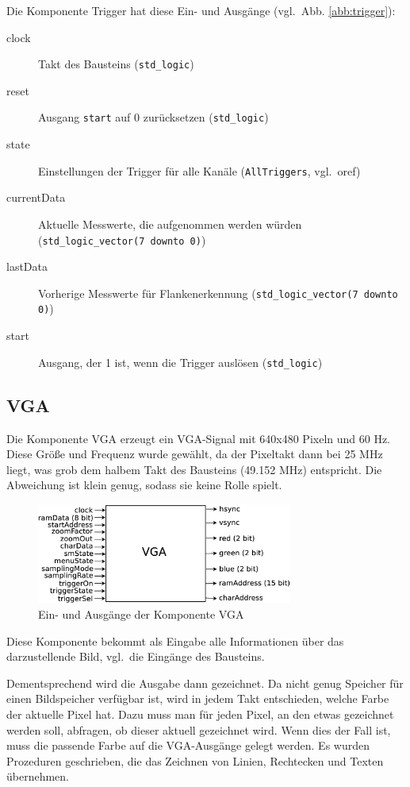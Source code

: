 \documentclass[IN,ngerman,utf8,12pt]{tumbook}
\newcommand{\vgl}{vgl.\ }
\begin{document}
Die Komponente Trigger hat diese Ein- und Ausgänge (\vgl Abb. \ref{abb:trigger}):

\begin{description}
    \item[clock] Takt des Bausteins (\texttt{std\_logic})
    \item[reset] Ausgang \texttt{start} auf 0 zurücksetzen (\texttt{std\_logic})
    \item[state] Einstellungen der Trigger für alle Kanäle (\texttt{AllTriggers}, \vgl o{ref})
    \item[currentData] Aktuelle Messwerte, die aufgenommen werden würden (\texttt{std\_logic\_vector(7 downto 0)})
    \item[lastData] Vorherige Messwerte für Flankenerkennung (\texttt{std\_logic\_vector(7 downto 0)})
    \item[start] Ausgang, der 1 ist, wenn die Trigger auslösen (\texttt{std\_logic})
\end{description}

\subsection{VGA}

Die Komponente VGA erzeugt ein VGA-Signal mit 640x480 Pixeln und 60 Hz.
Diese Größe und Frequenz wurde gewählt, da der Pixeltakt dann bei 25 MHz liegt, was grob dem halbem Takt des Bausteins (49.152 MHz) entspricht.
Die Abweichung ist klein genug, sodass sie keine Rolle spielt.

\begin{figure}[H]
    \centerline{
        \includegraphics[width=0.75\textwidth]{img/vga}
    }
    \label{abb:vga}
    \caption{Ein- und Ausgänge der Komponente VGA}
\end{figure}

Diese Komponente bekommt als Eingabe alle Informationen über das darzustellende Bild, \vgl die Eingänge des Bausteins.

Dementsprechend wird die Ausgabe dann gezeichnet.
Da nicht genug Speicher für einen Bildspeicher verfügbar ist, wird in jedem Takt entschieden, welche Farbe der aktuelle Pixel hat.
Dazu muss man für jeden Pixel, an den etwas gezeichnet werden soll, abfragen, ob dieser aktuell gezeichnet wird.
Wenn dies der Fall ist, muss die passende Farbe auf die VGA-Ausgänge gelegt werden.
Es wurden Prozeduren geschrieben, die das Zeichnen von Linien, Rechtecken und Texten übernehmen.
\end{document}
